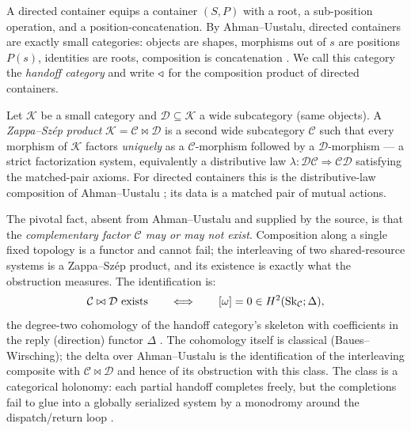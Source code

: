 \begin{definition}
A directed container equips a container $(S,P)$ with a root, a sub-position operation, and
a position-concatenation. By Ahman--Uustalu, directed containers are exactly small
categories: objects are shapes, morphisms out of $s$ are positions $P(s)$, identities are
roots, composition is concatenation \cite{AU16}. We call this category the \emph{handoff
category} and write $\triangleleft$ for the composition product of directed containers.
\end{definition}

\begin{definition}
Let $\mathcal K$ be a small category and $\mathcal D\subseteq\mathcal K$ a wide
subcategory (same objects). A \emph{Zappa--Sz\'ep product} $\mathcal K=\mathcal C\bowtie
\mathcal D$ is a second wide subcategory $\mathcal C$ such that every morphism of
$\mathcal K$ factors \emph{uniquely} as a $\mathcal C$-morphism followed by a
$\mathcal D$-morphism --- a strict factorization system, equivalently a distributive law
$\lambda\colon\mathcal D\mathcal C\Rightarrow\mathcal C\mathcal D$ satisfying the
matched-pair axioms. For directed containers this is the distributive-law composition of
Ahman--Uustalu \cite{AU16}; its data is a matched pair of mutual actions.
\end{definition}

The pivotal fact, absent from Ahman--Uustalu and supplied by the source, is that the
\emph{complementary factor $\mathcal C$ may or may not exist}. Composition along a single
fixed topology is a functor and cannot fail; the interleaving of two shared-resource
systems is a Zappa--Sz\'ep product, and its existence is exactly what the obstruction
measures. The identification is:
\[
  \mathcal C\bowtie\mathcal D \text{ exists}
  \qquad\Longleftrightarrow\qquad
  [\omega]=0\in H^2(\mathrm{Sk}_{\mathcal C};\Delta),
\]
the degree-two cohomology of the handoff category's skeleton with coefficients in the
reply (direction) functor $\Delta$ \cite{cl-h2edges}. The cohomology itself is classical
(Baues--Wirsching); the delta over Ahman--Uustalu is the identification of the
interleaving composite with $\mathcal C\bowtie\mathcal D$ and hence of its obstruction
with this class. The class is a categorical holonomy: each partial handoff completes
freely, but the completions fail to glue into a globally serialized system by a
monodromy around the dispatch/return loop \cite{cl-emergent}.


